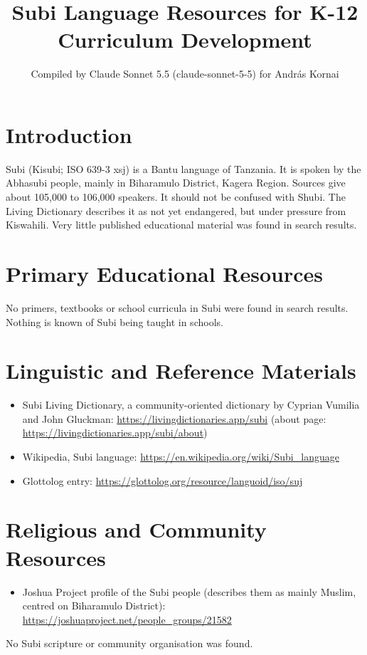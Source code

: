 \documentclass[12pt]{article}
\title{Subi Language Resources for K-12 Curriculum Development}
\author{Compiled by Claude Sonnet 5.5 (claude-sonnet-5-5) for Andr\'as Kornai}
\date{}
\begin{document}
\maketitle

\section{Introduction}
Subi (Kisubi; ISO 639-3 xsj) is a Bantu language of Tanzania. It is spoken by the Abhasubi people, mainly in Biharamulo District, Kagera Region. Sources give about 105,000 to 106,000 speakers. It should not be confused with Shubi. The Living Dictionary describes it as not yet endangered, but under pressure from Kiswahili. Very little published educational material was found in search results.

\section{Primary Educational Resources}
No primers, textbooks or school curricula in Subi were found in search results. Nothing is known of Subi being taught in schools.

\section{Linguistic and Reference Materials}
\begin{itemize}
\item Subi Living Dictionary, a community-oriented dictionary by Cyprian Vumilia and John Gluckman: \url{https://livingdictionaries.app/subi} (about page: \url{https://livingdictionaries.app/subi/about})
\item Wikipedia, Subi language: \url{https://en.wikipedia.org/wiki/Subi_language}
\item Glottolog entry: \url{https://glottolog.org/resource/languoid/iso/suj}
\end{itemize}

\section{Religious and Community Resources}
\begin{itemize}
\item Joshua Project profile of the Subi people (describes them as mainly Muslim, centred on Biharamulo District): \url{https://joshuaproject.net/people_groups/21582}
\end{itemize}
No Subi scripture or community organisation was found.
\end{document}
